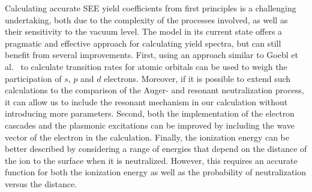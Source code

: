 \begin{refsection}
Calculating accurate SEE yield coefficients from first principles is a 
challenging undertaking, both due to the complexity of the processes involved, 
as well as their sensitivity to the vacuum level. The model in its current state 
offers a pragmatic and effective approach for calculating yield spectra, but 
can still benefit from several improvements. First, using an approach similar to 
Goebl et al.~\cite{Goebl2011} to calculate transition rates for atomic orbitals 
can be used to weigh the participation of $s$, $p$ and $d$ electrons. Moreover, if 
it is possible to extend such calculations to the comparison of the Auger- and resonant
neutralization process, it can allow us to include the resonant mechanism in our 
calculation without introducing more parameters. Second, both 
the implementation of the electron cascades and the plasmonic excitations can be 
improved by including the wave vector of the electron in the 
calculation. Finally, the ionization energy can be better described by considering 
a range of energies that depend on the distance of the ion to the surface when it 
is neutralized. However, this requires an accurate function for both the ionization 
energy as well as the probability of neutralization versus the distance. 
 
\printbibliography 
\end{refsection} 
